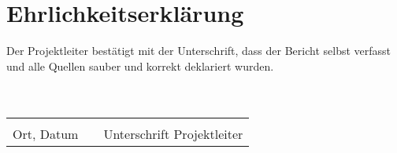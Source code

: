 \section{Ehrlichkeitserkl\"arung}
Der Projektleiter bestätigt mit der Unterschrift, dass der Bericht selbst verfasst und alle Quellen sauber und korrekt deklariert wurden.\\
\\
\\


\begin{tabular}{lp{20em}l}
 \hspace{3cm}   && \hspace{3cm} \\\cline{1-1}\cline{3-3}
 Ort, Datum     && Unterschrift Projektleiter
\end{tabular}

\newpage